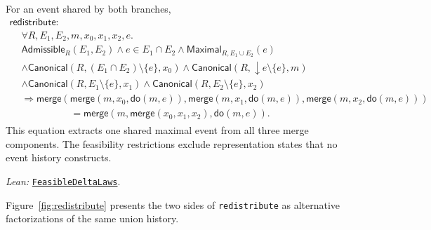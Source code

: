\documentclass[11pt]{article}
\theoremstyle{definition}
\newcommand{\doop}{\mathsf{do}}
\newcommand{\merge}{\mathsf{merge}}
\newcommand{\Can}{\mathsf{Canonical}}
\newcommand{\lean}[1]{\texttt{#1}}
\newcommand{\src}[2]{\href{../../#1}{\texttt{#2}}}
\newcommand{\anchor}[2]{\par\smallskip\noindent\emph{Lean: }\src{#1}{#2}.}
\begin{document}
For an event shared by both branches,
\[
\begin{gathered}
 \mathsf{redistribute}:\\[-0.3em]
\begin{aligned}
 &\forall R,E_1,E_2,m,x_0,x_1,x_2,e.\\
 &\mathsf{Admissible}_R(E_1,E_2)
   \land e\in E_1\cap E_2
   \land\mathsf{Maximal}_{R,E_1\cup E_2}(e)\\
 &\land\Can(R,(E_1\cap E_2)\setminus\{e\},x_0)
   \land\Can(R,\downarrow e\setminus\{e\},m)\\
 &\land\Can(R,E_1\setminus\{e\},x_1)
   \land\Can(R,E_2\setminus\{e\},x_2)\\
 &\Longrightarrow
 \merge(\merge(m,x_0,\doop(m,e)),
        \merge(m,x_1,\doop(m,e)),
        \merge(m,x_2,\doop(m,e)))\\
 &\hspace{5em}=
 \merge(m,\merge(x_0,x_1,x_2),\doop(m,e)).
\end{aligned}
\end{gathered}
\]
This equation extracts one shared maximal event from all three merge
components.  The feasibility restrictions exclude representation states that
no event history constructs.
\anchor{Sal/MRDTs/Framework/MergeLaws.lean}{FeasibleDeltaLaws}

Figure~\ref{fig:redistribute} presents the two sides of \lean{redistribute}
as alternative factorizations of the same union history.
\end{document}

